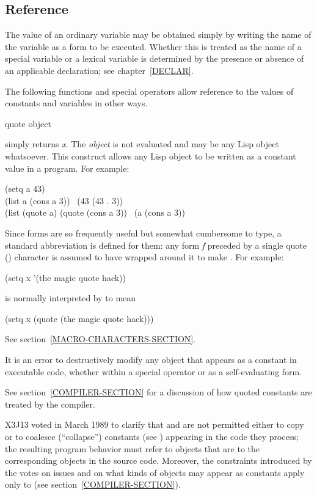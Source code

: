 \subsection{Reference}

The value of an ordinary variable
may be obtained simply by writing the name of the variable
as a form to be executed.  Whether this is treated as the name
of a special variable or a lexical variable is determined
by the presence or absence of an applicable  declaration;
see chapter~\ref{DECLAR}.

The following functions and special operators allow reference to the
values of constants and variables in other ways.

\begin{defspec}
quote object

 simply returns \emph{x}.
The \emph{object} is not evaluated and may be any Lisp object whatsoever.
This construct allows any Lisp object to be written as a constant
value in a program.
For example:
\begin{lisp}
(setq a 43) \\
(list a (cons a 3)) \EV\ (43 (43 . 3)) \\
(list (quote a) (quote (cons a 3)) \EV\ (a (cons a 3))
\end{lisp}
Since  forms are so frequently useful
but somewhat cumbersome to type, a standard abbreviation is defined for them:
any form \emph{f} preceded by a single quote () character
is assumed to have  wrapped around it to
make .
For example:
\begin{lisp}
(setq x '(the magic quote hack))
\end{lisp}
is normally interpreted by  to mean
\begin{lisp}
(setq x (quote (the magic quote hack)))
\end{lisp}
See section~\ref{MACRO-CHARACTERS-SECTION}.

It is an error to destructively modify any object that appears as a constant
in executable code, whether within a  special operator or as
a self-evaluating form.

See section~\ref{COMPILER-SECTION} for a discussion of how quoted constants
are treated by the compiler.

\begin{newer}
X3J13 voted in March 1989  to clarify that
 and  are not permitted either to copy or
to coalesce (``collapse'') constants (see )
appearing in the code they process; the resulting
program behavior must refer to objects that are  to the
corresponding objects in the source code.
Moreover, the constraints introduced by the votes on
issues 
and 
on what kinds of objects may appear
as constants apply only to  (see section~\ref{COMPILER-SECTION}).
\end{newer}
\end{defspec}

